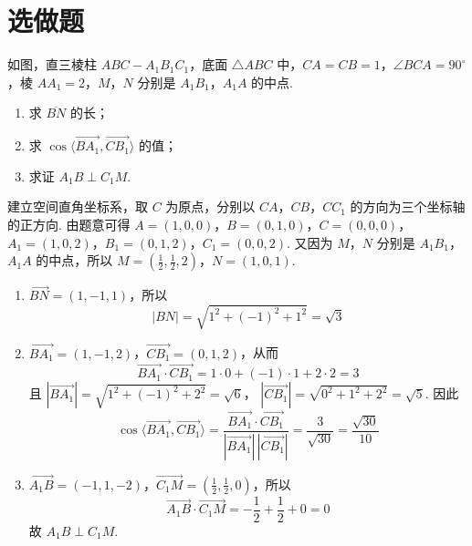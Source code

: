 \section{选做题}

\begin{problem}[甲]
如图，直三棱柱 \(ABC - A_{1}B_{1}C_{1}\)，底面 \(\triangle ABC\) 中，\(CA = CB = 1\)，\(\angle BCA = 90^{\circ}\)，棱 \(AA_{1} = 2\)，\(M\)，\(N\) 分别是 \(A_{1}B_{1}\)，\(A_{1}A\) 的中点.

\begin{enumerate}
\item 求 \(\overline{BN}\) 的长；
\item 求 \(\cos\langle\overrightarrow{BA_{1}},\overrightarrow{CB_{1}}\rangle\) 的值；
\item 求证 \(A_{1}B \perp C_{1}M\).
\end{enumerate}

\end{problem}

\begin{solution}
建立空间直角坐标系，取 \(C\) 为原点，分别以 \(CA\)，\(CB\)，\(CC_{1}\) 的方向为三个坐标轴的正方向.
由题意可得 \(A=(1,0,0)\)，\(B=(0,1,0)\)，\(C=(0,0,0)\)，\(A_{1}=(1,0,2)\)，\(B_{1}=(0,1,2)\)，\(C_{1}=(0,0,2)\).
又因为 \(M\)，\(N\) 分别是 \(A_{1}B_{1}\)，\(A_{1}A\) 的中点，所以
\(M=\left(\frac{1}{2},\frac{1}{2},2\right)\)，\(N=(1,0,1)\).

\begin{enumerate}
\item \(\overrightarrow{BN}=(1,-1,1)\)，所以
\[
|BN|=\sqrt{1^{2}+(-1)^{2}+1^{2}}=\sqrt{3}
\]
\item \(\overrightarrow{BA_{1}}=(1,-1,2)\)，\(\overrightarrow{CB_{1}}=(0,1,2)\)，从而
\[
\overrightarrow{BA_{1}}\cdot\overrightarrow{CB_{1}}=1\cdot0+(-1)\cdot1+2\cdot2=3
\]
且 \(|\overrightarrow{BA_{1}}|=\sqrt{1^{2}+(-1)^{2}+2^{2}}=\sqrt{6}\)，
\(|\overrightarrow{CB_{1}}|=\sqrt{0^{2}+1^{2}+2^{2}}=\sqrt{5}\).
因此
\[
\cos\langle\overrightarrow{BA_{1}},\overrightarrow{CB_{1}}\rangle=\frac{\overrightarrow{BA_{1}}\cdot\overrightarrow{CB_{1}}}{|\overrightarrow{BA_{1}}|\,|\overrightarrow{CB_{1}}|}=\frac{3}{\sqrt{30}}=\frac{\sqrt{30}}{10}
\]
\item \(\overrightarrow{A_{1}B}=(-1,1,-2)\)，\(\overrightarrow{C_{1}M}=\left(\frac{1}{2},\frac{1}{2},0\right)\)，所以
\[
\overrightarrow{A_{1}B}\cdot\overrightarrow{C_{1}M}=-\frac{1}{2}+\frac{1}{2}+0=0
\]
故 \(A_{1}B\perp C_{1}M\).
\end{enumerate}
\end{solution}

